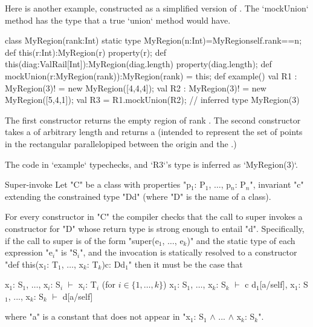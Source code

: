 \begin{example}
Here is another example, constructed as a simplified 
version of .  The \xcd`mockUnion` method 
has the type that a true \xcd`union` method would have.

\begin{xten}
class MyRegion(rank:Int) {
  static type MyRegion(n:Int)=MyRegion{self.rank==n};
  def this(r:Int):MyRegion(r) {
    property(r);
  }
  def this(diag:ValRail[Int]):MyRegion(diag.length){ 
    property(diag.length);
  }
  def mockUnion(r:MyRegion(rank)):MyRegion(rank) = this;
  def example() {
    val R1 : MyRegion(3)! = new MyRegion([4,4,4]); 
    val R2 : MyRegion(3)! = new MyRegion([5,4,1]); 
    val R3 = R1.mockUnion(R2); // inferred type MyRegion(3)
  }
}
\end{xten}
%
The first constructor returns the empty region of rank .  The
second constructor takes a  of arbitrary length
 and returns a  (intended to represent the set
of points in the rectangular parallelopiped between the origin and the
.)

The code in \xcd`example` typechecks, and \xcd`R3`'s type is inferred as
\xcd`MyRegion(3)`.  


\end{example}

\begin{staticrule}{Super-invoke}
   Let \xcd"C" be a class with properties
   \xcdmath"p$_1$: P$_1$, $\dots$, p$_n$: P$_n$", invariant \xcd"c"
   extending the constrained type \xcd"D{d}" (where \xcd"D" is the name of a class).

   For every constructor in \xcd"C" the compiler checks that the call to
   super invokes a constructor for \xcd"D" whose return type is strong enough
   to entail \xcd"d". Specifically, if the call to super is of the form 
     \xcdmath"super(e$_1$, $\dots$, e$_k$)"
   and the static type of each expression \xcdmath"e$_i$" is
   \xcdmath"S$_i$", and the invocation
   is statically resolved to a constructor
\xcdmath"def this(x$_1$: T$_1$, $\dots$, x$_k$: T$_k$){c}: D{d$_1$}"
   then it must be the case that 
\begin{xtenmath}
x$_1$: S$_1$, $\dots$, x$_i$: S$_i$ $\vdash$ x$_i$: T$_i$  (for $i \in \{1, \dots, k\}$)
x$_1$: S$_1$, $\dots$, x$_k$: S$_k$ $\vdash$ c  
d$_1$[a/self], x$_1$: S$_1$, ..., x$_k$: S$_k$ $\vdash$ d[a/self]      
\end{xtenmath}
\noindent where \xcd"a" is a constant that does not appear in 
\xcdmath"x$_1$: S$_1$ $\wedge$ ... $\wedge$ x$_k$: S$_k$".
\end{staticrule}

